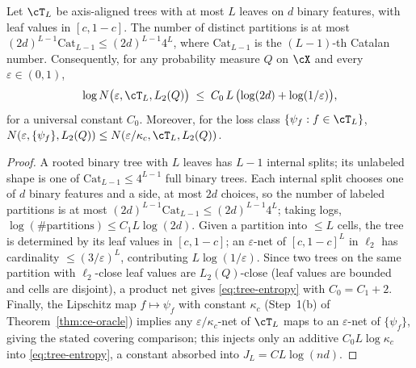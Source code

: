 
\begin{lemma}\label{lem:complexity}
Let $\cT_L$ be axis-aligned trees with at most $L$ leaves on $d$ binary
features, with leaf values in $[c,1-c]$. The number of distinct partitions is at
most $(2d)^{L-1} \mathrm{Cat}_{L-1} \le (2d)^{L-1} 4^L$, where
$\mathrm{Cat}_{L-1}$ is the $(L-1)$-th Catalan number. Consequently, for any
probability measure $Q$ on $\cX$ and every $\varepsilon \in (0,1)$,
\begin{equation}\label{eq:tree-entropy}
  \log N\bigl(\varepsilon, \cT_L, L_2(Q)\bigr)
  \;\le\; C_0\, L\,\bigl(\log(2d) + \log(1/\varepsilon)\bigr),
\end{equation}
for a universal constant $C_0$. Moreover, for the loss class
$\{\psi_f : f \in \cT_L\}$,
$N(\varepsilon, \{\psi_f\}, L_2(Q))
 \le N(\varepsilon/\kappa_c, \cT_L, L_2(Q))$.
\end{lemma}

\begin{proof}
A rooted binary tree with $L$ leaves has $L-1$ internal splits; its unlabeled
shape is one of $\mathrm{Cat}_{L-1} \le 4^{L-1}$ full binary trees. Each internal
split chooses one of $d$ binary features and a side, at most $2d$ choices, so the
number of labeled partitions is at most $(2d)^{L-1}\mathrm{Cat}_{L-1} \le
(2d)^{L-1}4^L$; taking logs, $\log(\#\text{partitions}) \le C_1 L \log(2d)$.
Given a partition into $\le L$ cells, the tree is determined by its leaf values
in $[c,1-c]$; an $\varepsilon$-net of $[c,1-c]^{L}$ in $\ell_2$ has cardinality
$\le (3/\varepsilon)^{L}$, contributing $L\log(1/\varepsilon)$. Since two trees
on the same partition with $\ell_2$-close leaf values are $L_2(Q)$-close (leaf
values are bounded and cells are disjoint), a product net gives
\eqref{eq:tree-entropy} with $C_0 = C_1 + 2$. Finally, the Lipschitz map
$f \mapsto \psi_f$ with constant $\kappa_c$ (Step~1(b) of
Theorem~\ref{thm:ce-oracle}) implies any $\varepsilon/\kappa_c$-net of $\cT_L$
maps to an $\varepsilon$-net of $\{\psi_f\}$, giving the stated covering
comparison; this injects only an additive $C_0 L \log\kappa_c$ into
\eqref{eq:tree-entropy}, a constant absorbed into $J_L = C L\log(nd)$.
\end{proof}


